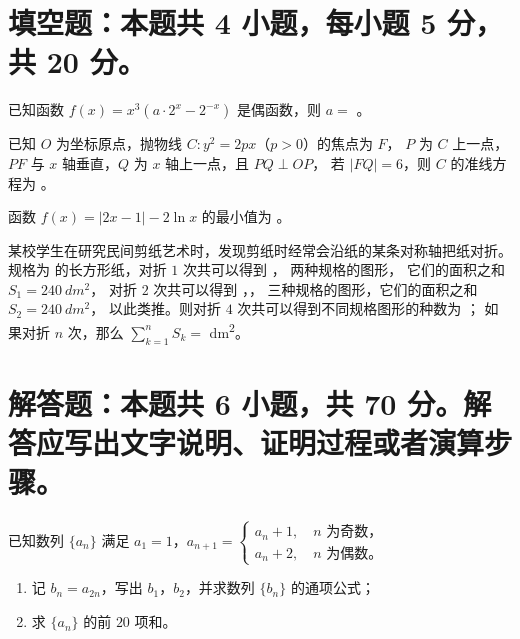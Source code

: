 \documentclass{exam-zh}
\begin{document}
\section{填空题：本题共 4 小题，每小题 5 分，共 20 分。}

\begin{question}
  已知函数 $f(x) = x^3 (a \cdot 2^x - 2^{-x})$ 是偶函数，则 $a = $ \fillin[$1$] 。
\end{question}

\begin{question}
  已知 $O$ 为坐标原点，抛物线 $C \colon y^2 = 2px$（$p > 0$）的焦点为 $F$，
  $P$ 为 $C$ 上一点，$PF$ 与 $x$ 轴垂直，$Q$ 为 $x$ 轴上一点，且 $PQ \perp OP$，
  若 $|FQ| = 6$，则 $C$ 的准线方程为 \fillin[$\dfrac{1}{3}$] 。
\end{question}

\begin{question}
  函数 $f(x) = |2x - 1| - 2 \ln x$ 的最小值为 \fillin[width = 4em][] 。
\end{question}

\begin{question}
  某校学生在研究民间剪纸艺术时，发现剪纸时经常会沿纸的某条对称轴把纸对折。
  规格为  的长方形纸，对折 $1$ 次共可以得到
  ，  两种规格的图形，
  它们的面积之和 $S_1 = \qty{240}{dm^2}$，
  对折 $2$ 次共可以得到 ，，
   三种规格的图形，它们的面积之和 $S_2 = \qty{240}{dm^2}$，
  以此类推。则对折 $4$ 次共可以得到不同规格图形的种数为 \fillin ；
  如果对折 $n$ 次，那么 $\sum_{k=1}^n S_k = $ \fillin \unit{dm^2}。
\end{question}



\section{解答题：本题共 6 小题，共 70 分。解答应写出文字说明、证明过程或者演算步骤。}

\begin{problem}[points = 10]
  已知数列 $\{a_n\}$ 满足 $a_1 = 1$，$a_{n+1} =
    \begin{cases}
      a_n + 1, \quad \text{$n$ 为奇数，} \\
      a_n + 2, \quad \text{$n$ 为偶数。}
    \end{cases}$
  \begin{enumerate}
    \item 记 $b_n = a_{2n}$，写出 $b_1$，$b_2$，并求数列 $\{b_n\}$ 的通项公式；
    \item 求 $\{a_n\}$ 的前 $20$ 项和。
  \end{enumerate}
\end{problem}
\end{document}
